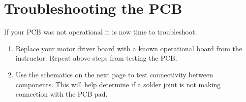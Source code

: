 \documentclass{handout}
\begin{document}
	\section{Troubleshooting the PCB}
	If your PCB was not operational it is now time to troubleshoot. 
	\begin{enumerate}
		\item Replace your motor driver board with a known operational board from the instructor. Repeat above steps from testing the PCB.
		\item Use the schematics on the next page to test connectivity between components. This will help determine if a solder joint is not making connection with the PCB pad.
	\end{enumerate}
\end{document}
